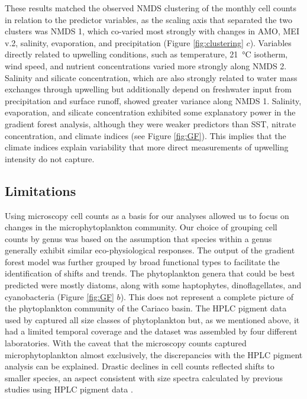 \documentclass[draft]{agujournal2019}
\begin{document}
    These results matched the observed NMDS clustering of the monthly cell counts in relation to the predictor variables, as the scaling axis that separated the two clusters was NMDS 1, which co-varied most strongly with changes in AMO, MEI v.2, salinity, evaporation, and precipitation (Figure \ref{fig:clustering} $c$). Variables directly related to upwelling conditions, such as temperature, \qty{21}{\celsius} isotherm, wind speed, and nutrient concentrations varied more strongly along NMDS 2. Salinity and silicate concentration, which are also strongly related to water mass exchanges through upwelling but additionally depend on freshwater input from precipitation and surface runoff, showed greater variance along NMDS 1. Salinity, evaporation, and silicate concentration exhibited some explanatory power in the gradient forest analysis, although they were weaker predictors than SST, nitrate concentration, and climate indices (see Figure \ref{fig:GF}). This implies that the climate indices explain variability that more direct measurements of upwelling intensity do not capture. 
    

\subsection{Limitations}
    
    Using microscopy cell counts as a basis for our analyses allowed us to focus on changes in the microphytoplankton community. Our choice of grouping cell counts by genus was based on the assumption that species within a genus generally exhibit similar eco-physiological responses. The output of the gradient forest model was further grouped by broad functional types to facilitate the identification of shifts and trends. The phytoplankton genera that could be best predicted were mostly diatoms, along with some haptophytes, dinoflagellates, and cyanobacteria (Figure \ref{fig:GF} $b$). This does not represent a complete picture of the phytoplankton community of the Cariaco basin. The HPLC pigment data used by  captured all size classes of phytoplankton but, as we mentioned above, it had a limited temporal coverage and the dataset was assembled by four different laboratories. With the caveat that the microscopy counts captured microphytoplankton almost exclusively, the discrepancies with the HPLC pigment analysis can be explained. Drastic declines in cell counts reflected shifts to smaller species, an aspect consistent with size spectra calculated by previous studies using HPLC pigment data \cite{lorenzoni_characterization_2015}.
    
\end{document}
